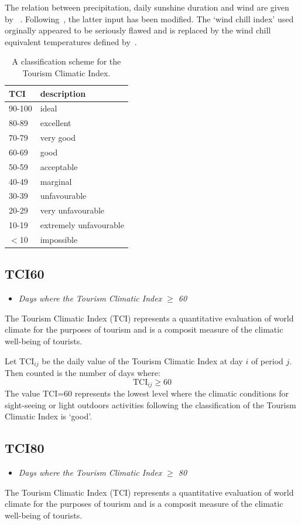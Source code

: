 \documentclass[a4paper,11pt]{article}
\begin{document}
The relation between precipitation, daily sunshine duration and wind are given by ~\citet{mieczkowski:85}. 
Following~\citet{perch-nielsen:10}, the latter input has been modified. The `wind chill index' 
used orginally appeared to be seriously flawed and is replaced by the wind chill equivalent temperatures
defined by~\citet{osczevski:05}.

\begin{table} [!h]
\begin{tabular}{l l}
TCI & description \\
\hline
90-100 & ideal \\
80-89  & excellent \\
70-79  & very good \\
60-69  & good \\
50-59  & acceptable \\
40-49  & marginal \\
30-39  & unfavourable \\
20-29  & very unfavourable \\
10-19  & extremely unfavourable \\
$<$10  & impossible \\
\end{tabular}
\caption{A classification scheme for the Tourism Climatic Index.
} \label{table:TCI}
\end{table}



\subsection*{TCI60}
\begin{itemize}
\item \textit{Days where the Tourism Climatic Index $\ge$ 60}
\end{itemize}
The Tourism Climatic Index (TCI) represents a quantitative evaluation
of world climate for the purposes of tourism and is a composit
measure of the climatic well-being of tourists. 

Let TCI$_{ij}$ be the daily value of the Tourism Climatic Index at day $i$ of period $j$.
Then counted is the number of days where:
\begin{equation*}
\text{TCI}_{ij} \ge 60
\end{equation*}
The value TCI=60 represents the lowest level where the climatic conditions for sight-seeing or light outdoors
activities following the classification of the Tourism Climatic Index is `good'.


\subsection*{TCI80}
\begin{itemize}
\item \textit{Days where the Tourism Climatic Index $\ge$ 80}
\end{itemize}
The Tourism Climatic Index (TCI) represents a quantitative evaluation
of world climate for the purposes of tourism and is a composit
measure of the climatic well-being of tourists. 
\end{document}
